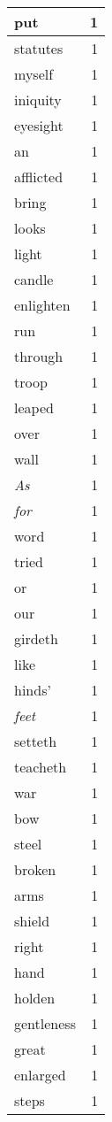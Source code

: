 \begin{center}
\begin{longtable}{l|r}
put & 1 \\ \hline
statutes & 1 \\ \hline
myself & 1 \\ \hline
iniquity & 1 \\ \hline
eyesight & 1 \\ \hline
an & 1 \\ \hline
afflicted & 1 \\ \hline
bring & 1 \\ \hline
looks & 1 \\ \hline
light & 1 \\ \hline
candle & 1 \\ \hline
enlighten & 1 \\ \hline
run & 1 \\ \hline
through & 1 \\ \hline
troop & 1 \\ \hline
leaped & 1 \\ \hline
over & 1 \\ \hline
wall & 1 \\ \hline
\emph{As} & 1 \\ \hline
\emph{for} & 1 \\ \hline
word & 1 \\ \hline
tried & 1 \\ \hline
or & 1 \\ \hline
our & 1 \\ \hline
girdeth & 1 \\ \hline
like & 1 \\ \hline
hinds' & 1 \\ \hline
\emph{feet} & 1 \\ \hline
setteth & 1 \\ \hline
teacheth & 1 \\ \hline
war & 1 \\ \hline
bow & 1 \\ \hline
steel & 1 \\ \hline
broken & 1 \\ \hline
arms & 1 \\ \hline
shield & 1 \\ \hline
right & 1 \\ \hline
hand & 1 \\ \hline
holden & 1 \\ \hline
gentleness & 1 \\ \hline
great & 1 \\ \hline
enlarged & 1 \\ \hline
steps & 1 \\ \hline

\end{longtable}
\end{center}
